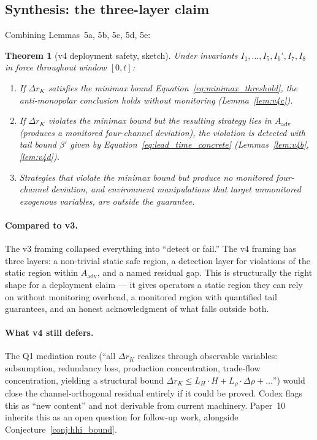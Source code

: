 \documentclass{article}
\newtheorem{theorem}{Theorem}
\begin{document}
\subsection{Synthesis: the three-layer claim}

Combining Lemmas~5a, 5b, 5c, 5d, 5e:

\begin{theorem}[v4 deployment safety, sketch]
\label{thm:v4_safety}
Under invariants $I_1, \ldots, I_5, I_6', I_7, I_8$ in force throughout
window $[0, t]$:
\begin{enumerate}
\item[(static)] If $\Delta r_K$ satisfies the minimax bound
  Equation~\ref{eq:minimax_threshold}, the anti-monopolar conclusion
  holds without monitoring (Lemma~\ref{lem:v4c}).
\item[(detection)] If $\Delta r_K$ violates the minimax bound but the
  resulting strategy lies in $A_{\mathrm{adv}}$ (produces a monitored
  four-channel deviation), the violation is detected with tail bound
  $\beta'$ given by Equation~\ref{eq:lead_time_concrete}
  (Lemmas~\ref{lem:v4b}, \ref{lem:v4d}).
\item[(gap)] Strategies that violate the minimax bound but produce no
  monitored four-channel deviation, and environment manipulations
  that target unmonitored exogenous variables, are outside the
  guarantee.
\end{enumerate}
\end{theorem}

\paragraph{Compared to v3.}
The v3 framing collapsed everything into ``detect or fail.''  The v4
framing has three layers: a non-trivial static safe region, a
detection layer for violations of the static region within
$A_{\mathrm{adv}}$, and a named residual gap.  This is structurally
the right shape for a deployment claim --- it gives operators a static
region they can rely on without monitoring overhead, a monitored
region with quantified tail guarantees, and an honest acknowledgment
of what falls outside both.

\paragraph{What v4 still defers.}
The Q1 mediation route (``all $\Delta r_K$ realizes through observable
variables: subsumption, redundancy loss, production concentration,
trade-flow concentration, yielding a structural bound $\Delta r_K \leq
L_H \cdot H + L_\rho \cdot \Delta\rho + \ldots$'') would close the
channel-orthogonal residual entirely if it could be proved.  Codex
flags this as ``new content'' and not derivable from current
machinery.  Paper~10 inherits this as an open question for follow-up
work, alongside Conjecture~\ref{conj:hhi_bound}.
\end{document}
